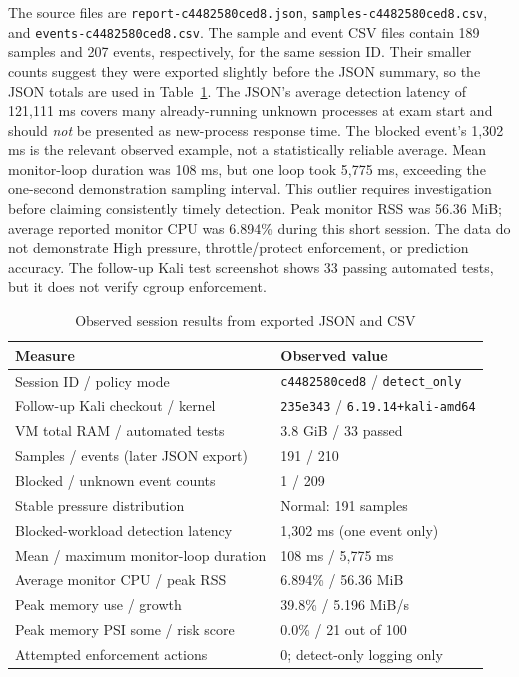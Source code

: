 \documentclass[12pt,a4paper]{article}
\newcommand{\code}[1]{\texttt{#1}}
\begin{document}
The source files are \code{report-c4482580ced8.json}, \code{samples-c4482580ced8.csv}, and \code{events-c4482580ced8.csv}. The sample and event CSV files contain 189 samples and 207 events, respectively, for the same session ID. Their smaller counts suggest they were exported slightly before the JSON summary, so the JSON totals are used in Table~\ref{tab:results}. The JSON's average detection latency of 121,111 ms covers many already-running unknown processes at exam start and should \emph{not} be presented as new-process response time. The blocked event's 1,302 ms is the relevant observed example, not a statistically reliable average. Mean monitor-loop duration was 108 ms, but one loop took 5,775 ms, exceeding the one-second demonstration sampling interval. This outlier requires investigation before claiming consistently timely detection. Peak monitor RSS was 56.36 MiB; average reported monitor CPU was 6.894\% during this short session. The data do not demonstrate High pressure, throttle/protect enforcement, or prediction accuracy. The follow-up Kali test screenshot shows 33 passing automated tests, but it does not verify cgroup enforcement.

\begin{table}[htbp]\centering
\caption{Observed session results from exported JSON and CSV}\label{tab:results}
\begin{tabular}{p{}p{}}\toprule Measure & Observed value\\\midrule
Session ID / policy mode & \code{c4482580ced8} / \code{detect\_only}\\
Follow-up Kali checkout / kernel & \code{235e343} / \code{6.19.14+kali-amd64}\\
VM total RAM / automated tests & 3.8 GiB / 33 passed\\
Samples / events (later JSON export) & 191 / 210\\
Blocked / unknown event counts & 1 / 209\\
Stable pressure distribution & Normal: 191 samples\\
Blocked-workload detection latency & 1,302 ms (one event only)\\
Mean / maximum monitor-loop duration & 108 ms / 5,775 ms\\
Average monitor CPU / peak RSS & 6.894\% / 56.36 MiB\\
Peak memory use / growth & 39.8\% / 5.196 MiB/s\\
Peak memory PSI some / risk score & 0.0\% / 21 out of 100\\
Attempted enforcement actions & 0; detect-only logging only\\
\bottomrule\end{tabular}
\end{table}
\end{document}
